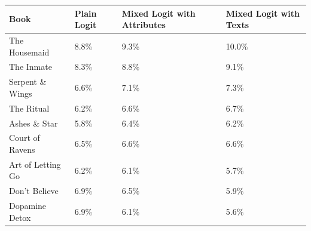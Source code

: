 \begin{centering}
\begin{tabular}{>{\raggedright}p{5cm}>{\raggedright}p{2cm}>{\centering}p{2cm}>{\centering}p{2cm}}
\hline
{\footnotesize\textbf{Book}} & {\footnotesize\textbf{Plain Logit}} & {\footnotesize\textbf{Mixed Logit with Attributes}} & {\footnotesize\textbf{Mixed Logit with Texts}}\tabularnewline
\hline
{\footnotesize The Housemaid} & {\footnotesize 8.8\%} & {\footnotesize 9.3\%} & {\footnotesize 10.0\%}\tabularnewline
{\footnotesize The Inmate} & {\footnotesize 8.3\%} & {\footnotesize 8.8\%} & {\footnotesize 9.1\%}\tabularnewline
{\footnotesize Serpent \& Wings} & {\footnotesize 6.6\%} & {\footnotesize 7.1\%} & {\footnotesize 7.3\%}\tabularnewline
{\footnotesize The Ritual} & {\footnotesize 6.2\%} & {\footnotesize 6.6\%} & {\footnotesize 6.7\%}\tabularnewline
{\footnotesize Ashes \& Star} & {\footnotesize 5.8\%} & {\footnotesize 6.4\%} & {\footnotesize 6.2\%}\tabularnewline
{\footnotesize Court of Ravens} & {\footnotesize 6.5\%} & {\footnotesize 6.6\%} & {\footnotesize 6.6\%}\tabularnewline
{\footnotesize Art of Letting Go} & {\footnotesize 6.2\%} & {\footnotesize 6.1\%} & {\footnotesize 5.7\%}\tabularnewline
{\footnotesize Don't Believe} & {\footnotesize 6.9\%} & {\footnotesize 6.5\%} & {\footnotesize 5.9\%}\tabularnewline
{\footnotesize Dopamine Detox} & {\footnotesize 6.9\%} & {\footnotesize 6.1\%} & {\footnotesize 5.6\%}\tabularnewline
\hline
\end{tabular}
\par\end{centering}